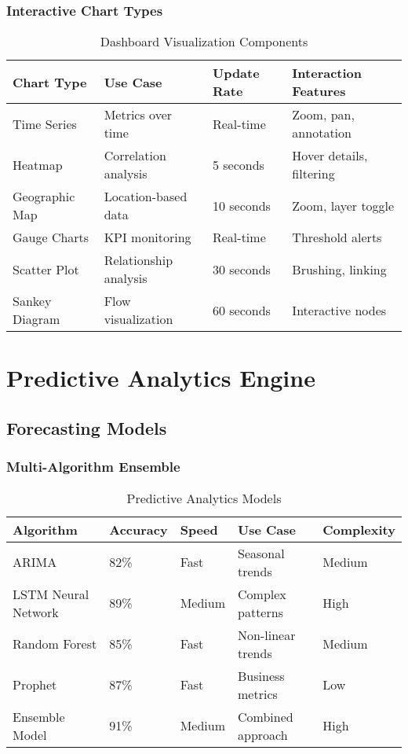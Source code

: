 \subsubsection{Interactive Chart Types}

\begin{table}[H]
\centering
\caption{Dashboard Visualization Components}
\begin{tabular}{|p{3cm}|p{3cm}|p{3cm}|p{3cm}|}
\hline
\textbf{Chart Type} & \textbf{Use Case} & \textbf{Update Rate} & \textbf{Interaction Features} \\
\hline
Time Series & Metrics over time & Real-time & Zoom, pan, annotation \\
\hline
Heatmap & Correlation analysis & 5 seconds & Hover details, filtering \\
\hline
Geographic Map & Location-based data & 10 seconds & Zoom, layer toggle \\
\hline
Gauge Charts & KPI monitoring & Real-time & Threshold alerts \\
\hline
Scatter Plot & Relationship analysis & 30 seconds & Brushing, linking \\
\hline
Sankey Diagram & Flow visualization & 60 seconds & Interactive nodes \\
\hline
\end{tabular}
\end{table}

\section{Predictive Analytics Engine}

\subsection{Forecasting Models}

\subsubsection{Multi-Algorithm Ensemble}

\begin{table}[H]
\centering
\caption{Predictive Analytics Models}
\begin{tabular}{|p{3cm}|p{2cm}|p{2cm}|p{2cm}|p{3cm}|}
\hline
\textbf{Algorithm} & \textbf{Accuracy} & \textbf{Speed} & \textbf{Use Case} & \textbf{Complexity} \\
\hline
ARIMA & 82\% & Fast & Seasonal trends & Medium \\
\hline
LSTM Neural Network & 89\% & Medium & Complex patterns & High \\
\hline
Random Forest & 85\% & Fast & Non-linear trends & Medium \\
\hline
Prophet & 87\% & Fast & Business metrics & Low \\
\hline
Ensemble Model & 91\% & Medium & Combined approach & High \\
\hline
\end{tabular}
\end{table}

